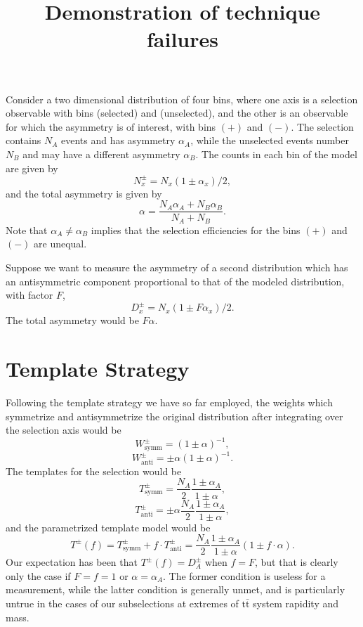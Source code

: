 \documentclass[letterpaper,11pt]{article}
\title{Demonstration of technique failures}
\begin{document}
\maketitle

Consider a two dimensional distribution of four bins, where one axis
is a selection observable with bins (selected) and (unselected), and
the other is an observable for which the asymmetry is of interest,
with bins $(+)$ and $(-)$.  The selection contains $N_A$ events and
has asymmetry $\alpha_A$, while the unselected events number $N_B$ and
may have a different asymmetry $\alpha_B$.  The counts in each bin of
the model are given by
\[N_x^{\pm} = N_x(1\pm\alpha_x)/2,\]
and the total asymmetry is given by
\[\alpha = \frac{N_A\alpha_A + N_B\alpha_B}{N_A+N_B}.\]
Note that $\alpha_A\ne\alpha_B$ implies that the selection
efficiencies for the bins $(+)$ and $(-)$ are unequal.

Suppose we want to measure the asymmetry of a second distribution
which has an antisymmetric component proportional to that of the
modeled distribution, with factor $F$,
\[D_x^{\pm} = N_x(1\pm F\alpha_x)/2.\]
The total asymmetry would be $F\alpha$. 


\section{Template Strategy}
Following the template strategy we have so far employed, the weights
which symmetrize and antisymmetrize the original distribution after
integrating over the selection axis would be
\[W^\pm_{\mathrm{symm}} = (1\pm\alpha)^{-1},\]
\[W^\pm_{\mathrm{anti}} = \pm\alpha(1\pm\alpha)^{-1}.\]
The templates for the selection would be
\[T^{\pm}_{\mathrm{symm}} = \frac{N_A}{2}\frac{1\pm\alpha_A}{1\pm\alpha},\]
\[T^{\pm}_{\mathrm{anti}} = \pm\alpha\frac{N_A}{2}\frac{1\pm\alpha_A}{1\pm\alpha},\]
and the parametrized template model would be
\[T^{\pm}(f) = T^{\pm}_{\mathrm{symm}} + f\cdot T^\pm_{\mathrm{anti}} = \frac{N_A}{2}\frac{1\pm\alpha_A}{1\pm\alpha}(1\pm f\cdot\alpha).\]
Our expectation has been that $T^\pm(f) = D^\pm_A$ when $f=F$, but
that is clearly only the case if $F=f=1$ or $\alpha=\alpha_A$.  The
former condition is useless for a measurement, while the latter
condition is generally unmet, and is particularly untrue in the cases
of our subselections at extremes of $\mathrm{t\bar{t}}$ system
rapidity and mass.
\end{document}
